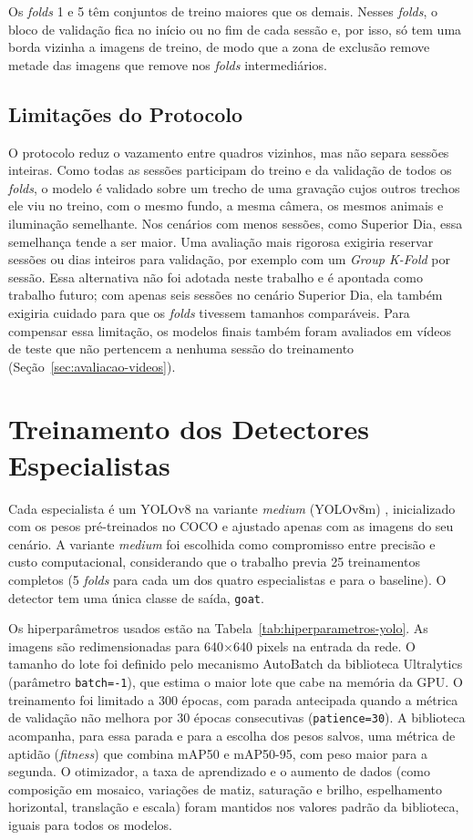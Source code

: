 Os \textit{folds} 1 e 5 têm conjuntos de treino maiores que os demais. Nesses \textit{folds}, o bloco de validação fica no início ou no fim de cada sessão e, por isso, só tem uma borda vizinha a imagens de treino, de modo que a zona de exclusão remove metade das imagens que remove nos \textit{folds} intermediários.

\subsection{Limitações do Protocolo}
\label{subsec:limitacoes-protocolo}

O protocolo reduz o vazamento entre quadros vizinhos, mas não separa sessões inteiras. Como todas as sessões participam do treino e da validação de todos os \textit{folds}, o modelo é validado sobre um trecho de uma gravação cujos outros trechos ele viu no treino, com o mesmo fundo, a mesma câmera, os mesmos animais e iluminação semelhante. Nos cenários com menos sessões, como Superior Dia, essa semelhança tende a ser maior. Uma avaliação mais rigorosa exigiria reservar sessões ou dias inteiros para validação, por exemplo com um \textit{Group K-Fold} por sessão. Essa alternativa não foi adotada neste trabalho e é apontada como trabalho futuro; com apenas seis sessões no cenário Superior Dia, ela também exigiria cuidado para que os \textit{folds} tivessem tamanhos comparáveis. Para compensar essa limitação, os modelos finais também foram avaliados em vídeos de teste que não pertencem a nenhuma sessão do treinamento (Seção~\ref{sec:avaliacao-videos}).

\section{Treinamento dos Detectores Especialistas}
\label{sec:especialistas}

Cada especialista é um YOLOv8 na variante \textit{medium} (YOLOv8m) \cite{jocher2023yolov8}, inicializado com os pesos pré-treinados no COCO e ajustado apenas com as imagens do seu cenário. A variante \textit{medium} foi escolhida como compromisso entre precisão e custo computacional, considerando que o trabalho previa 25 treinamentos completos (5 \textit{folds} para cada um dos quatro especialistas e para o baseline). O detector tem uma única classe de saída, \texttt{goat}.

Os hiperparâmetros usados estão na Tabela~\ref{tab:hiperparametros-yolo}. As imagens são redimensionadas para 640$\times$640 pixels na entrada da rede. O tamanho do lote foi definido pelo mecanismo AutoBatch da biblioteca Ultralytics (parâmetro \texttt{batch=-1}), que estima o maior lote que cabe na memória da GPU. O treinamento foi limitado a 300 épocas, com parada antecipada quando a métrica de validação não melhora por 30 épocas consecutivas (\texttt{patience=30}). A biblioteca acompanha, para essa parada e para a escolha dos pesos salvos, uma métrica de aptidão (\textit{fitness}) que combina mAP50 e mAP50-95, com peso maior para a segunda. O otimizador, a taxa de aprendizado e o aumento de dados (como composição em mosaico, variações de matiz, saturação e brilho, espelhamento horizontal, translação e escala) foram mantidos nos valores padrão da biblioteca, iguais para todos os modelos.


